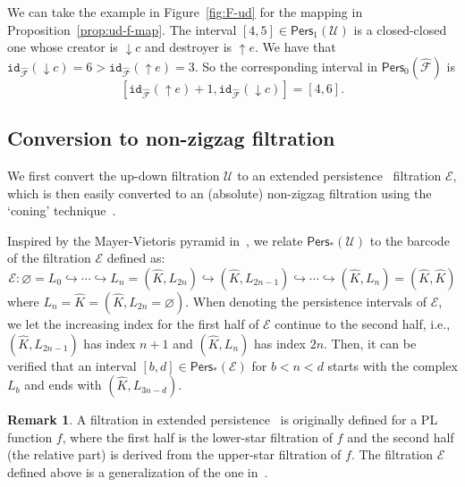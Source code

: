 \documentclass[letterpaper,11pt]{article}
\theoremstyle{mythmstyle}
\theoremstyle{mydefstyle}
\newtheorem{remark}{Remark}
\theoremstyle{plain}
\theoremstyle{definition}
\newtheorem{remark}[theorem]{Remark}
\newcommand{\id}{\mathtt{id}}
\newcommand{\Pers}{\mathsf{Pers}}
\newcommand{\<}[1]{\langle #1\rangle}
\newcommand{\incto}{\hookrightarrow}
\let\emptyset\varnothing
\newcommand{\Ecal}{\mathcal{E}}
\newcommand{\Fcal}{\mathcal{F}}
\newcommand{\Ucal}{\mathcal{U}}
\newcommand{\simpcnt}{n}
\newcommand{\Fnr}{{\hat{\Fcal}}}
\newcommand{\ud}{\Ucal}
\newcommand{\ucplx}{L}
\newcommand{\ef}{\Ecal}
\newcommand{\add}[1]{{\downarrow}#1}
\newcommand{\del}[1]{{\uparrow}#1}
\begin{document}
We can take the example in Figure~\ref{fig:F-ud} for the mapping in
Proposition~\ref{prop:ud-f-map}. 
The interval $[4,5]\in\Pers_1(\ud)$ is a closed-closed one
whose creator is $\add{c}$ and destroyer is $\del{e}$.
We have that $\id_\Fnr(\add{c})=6>\id_\Fnr(\del{e})=3$.
So the corresponding interval in $\Pers_0(\Fnr)$ is
\[
[\id_\Fnr(\del{e})+1,\id_\Fnr(\add{c})]=[4,6].
\]

\subsection{Conversion to non-zigzag filtration}
\label{sec:conv-to-std}

We first convert the up-down filtration $\ud$ to
an extended persistence~\cite{cohen2009extending} filtration $\ef$, which
is then easily converted to an (absolute) non-zigzag filtration using the `coning' technique~\cite{cohen2009extending}.

Inspired by the Mayer-Vietoris pyramid in~\cite{carlsson2009zigzag-realvalue},
we relate $\Pers_*(\ud)$ to the barcode of the filtration $\ef$
 defined as:
\[\ef:\emptyset=\ucplx_0
\incto
\cdots
\incto
\ucplx_{\simpcnt}=(\hat{K},\ucplx_{2\simpcnt})
\incto
(\hat{K},\ucplx_{2\simpcnt-1})
\incto
\cdots
\incto
(\hat{K},\ucplx_{\simpcnt})=(\hat{K},\hat{K})\]
where $\ucplx_{\simpcnt}=\hat{K}=(\hat{K},\ucplx_{2\simpcnt}=\emptyset)$.
When denoting the persistence intervals of $\ef$,
we let the increasing index for the first half of $\ef$ continue to the second half,
i.e., $(\hat{K},L_{2\simpcnt-1})$ has index $\simpcnt+1$
and $(\hat{K},L_{\simpcnt})$ has index $2\simpcnt$.
Then, it can be verified that 
an interval $[b,d]\in\Pers_*(\ef)$ for $b<\simpcnt<d$
starts with the complex $L_b$ and ends with $(\hat{K},L_{3\simpcnt-d})$.

\begin{remark}
A filtration in extended persistence~\cite{cohen2009extending} 
is originally defined for a PL function $f$, where the first half
is the lower-star filtration of $f$
and the second half (the relative part)
is derived from the upper-star filtration of $f$.
The filtration $\ef$ defined above is a generalization of the one in~\cite{cohen2009extending}.
\end{remark}
\end{document}
